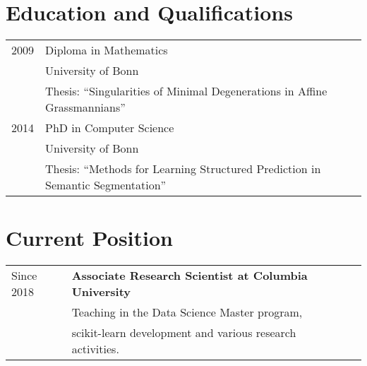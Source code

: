 \documentclass[a4paper,11pt]{article}
\begin{document}
\maketitle

\section{Education and Qualifications}
\begin{tabular}{lll}
    2009 & Diploma in Mathematics \\ & University of Bonn\\
         & Thesis: ``Singularities of Minimal Degenerations in Affine Grassmannians'' \\
    2014 & PhD in Computer Science \\ & University of Bonn \\
         & Thesis: ``Methods for Learning Structured Prediction in Semantic Segmentation''
\end{tabular}

\section{Current Position}
\begin{tabular}{lll}
    Since 2018 & \textbf{Associate Research Scientist at Columbia University}\\
               & Teaching in the Data Science Master program, \\
               & scikit-learn development and various research activities.
\end{tabular}
\end{document}
